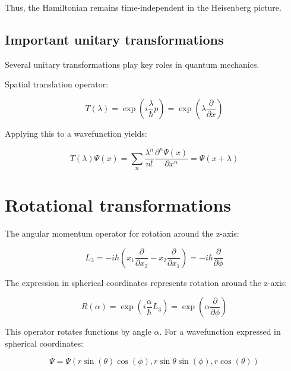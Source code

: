 \documentclass[italian]{HKNdocument}
\begin{document}
Thus, the Hamiltonian remains time-independent in the Heisenberg picture.

\subsection{Important unitary transformations}
Several unitary transformations play key roles in quantum mechanics.

Spatial translation operator:

\begin{equation}
T(\lambda)=\exp \left(i \frac{\lambda}{\hbar} p\right)=\exp \left(\lambda \frac{\partial}{\partial x}\right) \label{eq:10.47}
\end{equation}

Applying this to a wavefunction yields:

\begin{equation}
T(\lambda) \Psi(x)=\sum_{n} \frac{\lambda^{n}}{n!} \frac{\partial^{n} \Psi(x)}{\partial x^{n}}=\Psi(x+\lambda) \label{eq:10.48}
\end{equation}

\section{Rotational transformations}

The angular momentum operator for rotation around the z-axis:

\begin{equation}
L_{3}=-i \hbar\left(x_{1} \frac{\partial}{\partial x_{2}}-x_{2} \frac{\partial}{\partial x_{1}}\right)=-i \hbar \frac{\partial}{\partial \phi} \label{eq:10.49}
\end{equation}


The expression in spherical coordinates represents rotation around the z-axis:

\begin{equation}
R(\alpha)=\exp \left(i \frac{\alpha}{\hbar} L_{3}\right)=\exp \left(\alpha \frac{\partial}{\partial \phi}\right) \label{eq:10.50}
\end{equation}

This operator rotates functions by angle $\alpha$. For a wavefunction expressed in spherical coordinates:

\begin{equation}
\Psi=\Psi(r \sin (\theta) \cos (\phi), r \sin \theta \sin (\phi), r \cos (\theta)) \label{eq:10.51}
\end{equation}
\end{document}
